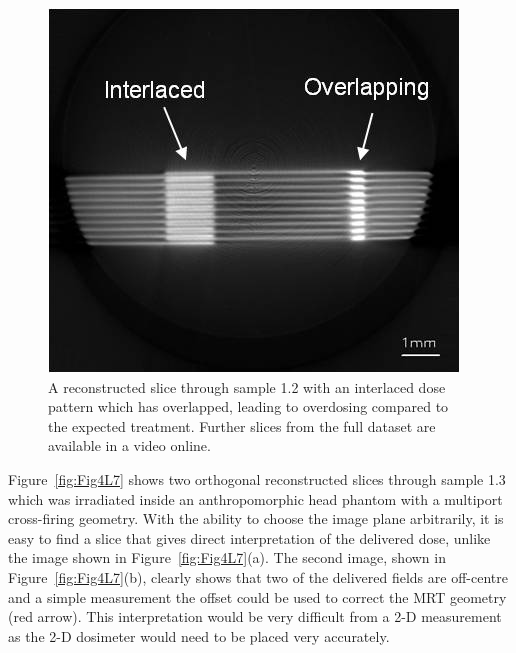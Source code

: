 \documentclass[12pt]{article}
\begin{document}
\begin{figure}
\centering
\includegraphics[width=0.7\linewidth]{Fig3}
\caption{A reconstructed slice through sample 1.2 with an interlaced dose pattern which has overlapped, leading to overdosing compared to the expected treatment. Further slices from the full dataset are available in a video online.}
\label{fig:Fig3S9}
\end{figure}


Figure~\ref{fig:Fig4L7} shows two orthogonal reconstructed slices through sample 1.3 which was irradiated inside an anthropomorphic head phantom with a multiport cross-firing geometry. With the ability to choose the image plane arbitrarily, it is easy to find a slice that gives direct interpretation of the delivered dose, unlike the image shown in Figure~\ref{fig:Fig4L7}(a). The second image, shown in Figure~\ref{fig:Fig4L7}(b), clearly shows that two of the delivered fields are off-centre and a simple measurement the offset could be used to correct the MRT geometry (red arrow). This interpretation would be very difficult from a 2-D measurement as the 2-D dosimeter would need to be placed very accurately. 
\end{document}
